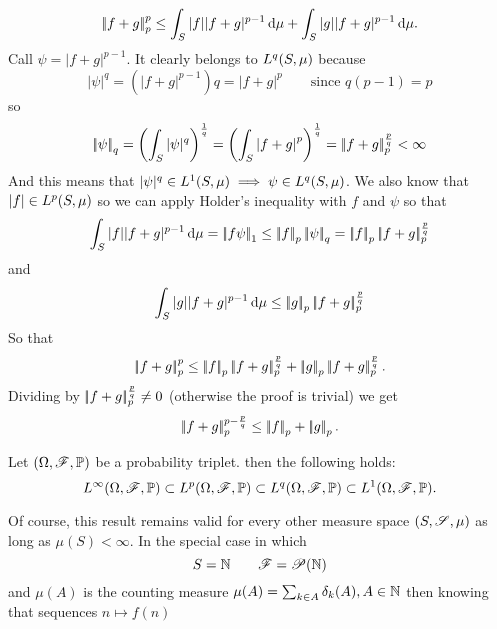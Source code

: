 \documentclass{article}
\begin{document}
\begin{fancyproof}
	\begin{equation*}
			\left|\negthinspace\left|f+g\right|\negthinspace\right|_{p}^{p}\leq \int_S|f||f+g|^{p-1}\mathop{}\!\mathrm{d}\mu+\int_S|g||f+g|^{p-1}\mathop{}\!\mathrm{d}\mu.
	\end{equation*}
	Call $\psi=|f+g|^{p-1}$. It clearly belongs to $L^{q}(S,\mu)$ because
	\begin{equation*}
		|\psi|^{q}=\left(|f+g|^{p-1}\right)q=\left|f+g\right|^{p}\qquad\text{since }q(p-1)=p
	\end{equation*}
	so
	\begin{equation*}
		\left|\negthinspace\left|\psi\right|\negthinspace\right|_{q}=\left(\int_S|\psi|^q\right)^{\frac{1}{q}}=\left(\int_S\left|f+g\right|^{p}\right)^{\frac{1}{q}}=\left|\negthinspace\left|f+g\right|\negthinspace\right|_{p}^{\frac{p}{q}}<\infty
	\end{equation*}
	And this means that $|\psi|^{q}\in L^{1}(S,\mu)\implies\psi\in L^{q}(S,\mu)$. We also know that $|f|\in L^{p}(S,\mu)$ so we can apply Holder's inequality with $f$ and $\psi$ so that
	\begin{equation*}
		\int_S|f||f+g|^{p-1}\dmu=\norm{f\psi}_1\leq\norm{f}_p\norm{\psi}_q=\norm{f}_p\norm{f+g}_p^{\frac{p}{q}}
	\end{equation*}
	and
	\begin{equation*}
		\int_S|g||f+g|^{p-1}\mathop{}\!\mathrm{d}\mu\leq\left|\negthinspace\left|g\right|\negthinspace\right|_p\left|\negthinspace\left|f+g\right|\negthinspace\right|_p^{\frac{p}{q}}
	\end{equation*}
	So that
	\begin{equation*}
		\norm{f+g}_p^p\leq\norm{f}_p\norm{f+g}_p^{\frac{p}{q}}+\norm{g}_p\norm{f+g}_p^{\frac{p}{q}}.
	\end{equation*}
	Dividing by $\left|\negthinspace\left|f+g\right|\negthinspace\right|_p^{\frac{p}{q}}\neq0$ (otherwise the proof is trivial) we get
	\begin{equation*}
		\left|\negthinspace\left|f+g\right|\negthinspace\right|_p^{p-\frac{p}{q}}\leq\left|\negthinspace\left|f\right|\negthinspace\right|_p+\left|\negthinspace\left|g\right|\negthinspace\right|_p.
	\end{equation*}
\end{fancyproof}
\begin{proposition}
	Let $(\Omega,\mathscr{F},\mathbb{P})$ be a probability triplet. then the following holds:
	\begin{equation*}
		L^{\infty}(\Omega,\mathscr{F},\mathbb{P})\subset L^{p}(\Omega,\mathscr{F},\mathbb{P})\subset L^{q}(\Omega,\mathscr{F},\mathbb{P})\subset L^{1}(\Omega,\mathscr{F},\mathbb{P}).
	\end{equation*}
\end{proposition}
Of course, this result remains valid for every other measure space $(S,\mathscr{S},\mu)$ as long as $\mu(S)<\infty$. In the special case in which 
\begin{equation*}
	S=\mathbb{N}\qquad\mathscr{F}=\mathscr{P}(\mathbb{N})
\end{equation*}
and $\mu(A)$ is the counting measure $\mu(A)=\sum_{k\in A}\delta_k(A),A\in\mathbb{N}$ then knowing that sequences $n\mapsto f(n)$
 
\end{document}
